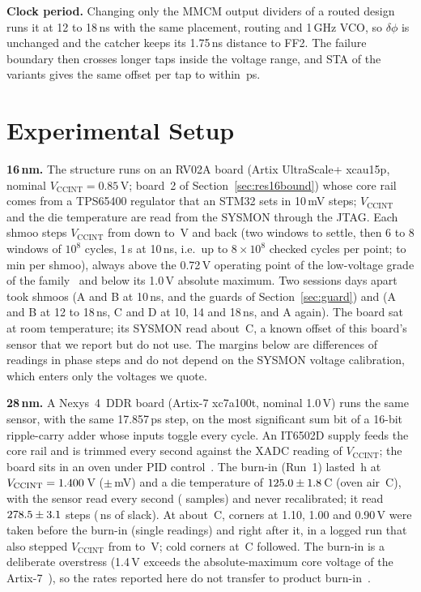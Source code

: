 \documentclass[conference]{IEEEtran}
\newcommand{\Vcc}{V_\mathrm{CCINT}}
\begin{document}
\textbf{Clock period.} Changing only the MMCM output dividers of a routed design runs it at 12 to
18\,ns with the same placement, routing and 1\,GHz VCO, so $\delta\phi$ is unchanged and the catcher
keeps its 1.75\,ns distance to FF2. The failure boundary then crosses longer taps inside the voltage
range, and STA of the variants gives the same offset per tap to within \vPeriodDstMaxPs\,ps.

\section{Experimental Setup}\label{sec:setup}

\textbf{16\,nm.} The structure runs on an RV02A board (Artix UltraScale+ xcau15p, nominal
$\Vcc=0.85$\,V; board~2 of Section~\ref{sec:res16bound}) whose core rail comes from a TPS65400
regulator that an STM32 sets in 10\,mV steps; $\Vcc$ and the die temperature are read from the
SYSMON through the JTAG. Each shmoo steps $\Vcc$ from \vTapVhi{} down to \vTapVlo\,V and back (two
windows to settle, then 6 to 8 windows of $10^{8}$ cycles, 1\,s at 10\,ns, i.e.\ up to
$8\times10^{8}$ checked cycles per point; \vShmooMinLo{} to \vShmooMinHi\,min per shmoo), always
above the 0.72\,V operating point of the low-voltage grade of the family~\cite{ds931} and below its
1.0\,V absolute maximum. Two sessions \vSessGapDays{} days apart took \vShmoosFirst{} shmoos (A and B
at 10\,ns, and the guards of Section~\ref{sec:guard}) and \vShmoosSecond{} (A and B at 12 to 18\,ns,
C and D at 10, 14 and 18\,ns, and A again). The board sat at room temperature; its
SYSMON read about \vTapDie\,\textdegree C, a known offset of this board's sensor that we report but
do not use. The margins below are differences of readings in phase steps and do not depend on the
SYSMON voltage calibration, which enters only the voltages we quote.

\textbf{28\,nm.} A Nexys~4~DDR board (Artix-7 xc7a100t, nominal 1.0\,V) runs the same sensor, with
the same 17.857\,ps step, on the most significant sum bit of a 16-bit ripple-carry adder whose
inputs toggle every cycle. An IT6502D supply feeds the core rail and is trimmed every second against
the XADC reading of $\Vcc$; the board sits in an oven under PID control~\cite{sbcci26}. The burn-in
(Run~1) lasted \vRunDurH\,h at $\Vcc=\vRunV$\,V ($\pm$\vRunVsdmV\,mV) and a die temperature of
$125.0\pm1.8$\,\textdegree C (oven air \vRunOven\,\textdegree C), with the sensor read every
second (\vRunN{} samples) and never recalibrated; it read $278.5\pm3.1$ steps
(\vRunSlackNs\,ns of slack). At about \vPreT\,\textdegree C, corners at 1.10, 1.00 and 0.90\,V were
taken before the burn-in (single readings) and right after it, in a logged run that also stepped
$\Vcc$ from \vSweepHi{} to \vSweepLo\,V; cold corners at \vColdT\,\textdegree C followed. The burn-in
is a deliberate overstress (1.4\,V exceeds the absolute-maximum core voltage of the
Artix-7~\cite{ds181}), so the rates reported here do not transfer to product
burn-in~\cite{jesd22a108}.
\end{document}
